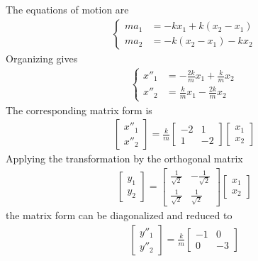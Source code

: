 \begin{Answer}
The equations of motion are
\begin{align*}
\left\{\begin{alignedat}{1}
ma_1 &= -kx_1 + k(x_2 - x_1)\\
ma_2 &= -k(x_2 - x_1) - kx_2
\end{alignedat}\right.
\end{align*}
Organizing gives
\begin{align*}
\left\{\begin{alignedat}{1}
x''_1 &= -\frac{2k}{m}x_1 + \frac{k}{m}x_2\\
x''_2 &= \frac{k}{m}x_1 - \frac{2k}{m}x_2
\end{alignedat}\right.
\end{align*}
The corresponding matrix form is
\begin{align*}
\begin{bmatrix}
x''_1\\
x''_2    
\end{bmatrix}
=
\frac{k}{m}
\begin{bmatrix}
-2 & 1\\
1 & -2
\end{bmatrix}
\begin{bmatrix}
x_1\\
x_2
\end{bmatrix}
\end{align*}
Applying the transformation by the orthogonal matrix
\begin{align*}
\begin{bmatrix}
y_1\\
y_2
\end{bmatrix}
=
\begin{bmatrix}
\frac{1}{\sqrt{2}} & -\frac{1}{\sqrt{2}}\\
\frac{1}{\sqrt{2}} & \frac{1}{\sqrt{2}}
\end{bmatrix}
\begin{bmatrix}
x_1\\
x_2
\end{bmatrix}
\end{align*}
the matrix form can be diagonalized and reduced to
\begin{align*}
\begin{bmatrix}
y''_1\\
y''_2
\end{bmatrix}
=
\frac{k}{m}
\begin{bmatrix}
-1 & 0\\
0 & -3
\end{bmatrix}

\end{align*}
\end{Answer}
